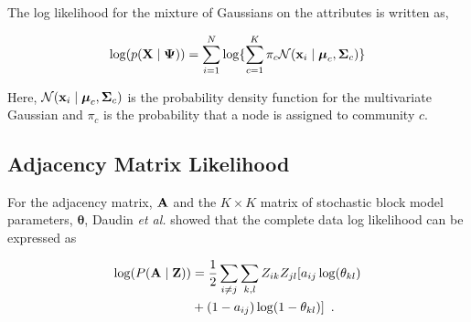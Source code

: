 The log likelihood for the mixture of Gaussians on the attributes is written as,

\begin{equation}
\log(p({\bf X} \mid {\boldsymbol \Psi}))=\sum_{i=1}^{N}\log\{\sum_{c=1}^{K}\pi_{c}\mathcal{N}({\bf x}_{i}\mid {\boldsymbol \mu}_{c},{\boldsymbol \Sigma}_{c})   \}
\end{equation}

%
Here, $\mathcal{N}({\bf x}_{i} \mid {\boldsymbol \mu}_{c},{\boldsymbol \Sigma}_{c})$ is the probability density function for the multivariate Gaussian and $\pi_{c}$ is the probability that a node is assigned to community $c$.

\subsection{Adjacency Matrix Likelihood}
For the adjacency matrix, ${\bf A}$ and the $K \times K$ matrix of stochastic block model parameters, ${\boldsymbol \theta}$, Daudin \emph{et al.} showed \cite{dudin} that the complete data log likelihood can be expressed as

\begin{equation}
\begin{split}
\log(P({\bf A} \mid {\bf Z}))&=\frac{1}{2}\sum_{i\ne j}\sum_{k,l}Z_{ik}Z_{jl}[a_{ij}\log (\theta_{kl})\\
&+(1-a_{ij})\log(1-\theta_{kl})]\enspace. 
\end{split}
\end{equation}



